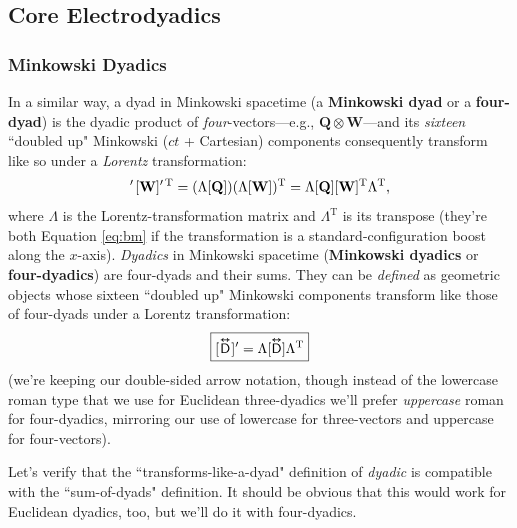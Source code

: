 \documentclass[12pt]{article}
\renewcommand{\vv}[1]{\mathbf{#1}}
\newcommand{\capdy}[1]{ \overset{ \text{\tiny$\bm\leftrightarrow$} }{\vphantom{\text{\small{A}}}\smash{#1}} }
\begin{document}
\subsection{Core Electrodyadics}\label{ssec:mfd}

\subsubsection{Minkowski Dyadics}

In a similar way, a dyad in Minkowski spacetime (a \textbf{Minkowski dyad} or a \textbf{four-dyad}) is the dyadic product of \emph{four}-vectors---e.g., $\vv Q \otimes \vv W$---and its \emph{sixteen} ``doubled up" Minkowski ($ct$ + Cartesian) components consequently transform like so under a \emph{Lorentz} transformation:
\begin{equation*}
[\vv Q ]^\prime \mkern2mu [\vv W]^{\prime \, \mathrm{T}} = ( \Lambda [\vv Q] ) ( \Lambda [\vv W] )^\mathrm{T} = \Lambda [\vv Q] [\vv W]^{\mathrm{T}} \Lambda^{\mathrm{T}} ,
\end{equation*}
where $\Lambda$ is the Lorentz-transformation matrix and $\Lambda^{\mathrm{T}}$ is its transpose (they're both Equation \ref{eq:bm} if the transformation is a standard-configuration boost along the $x$-axis). \emph{Dyadics} in Minkowski spacetime (\textbf{Minkowski dyadics} or \textbf{four-dyadics}) are four-dyads and their sums. They can be \emph{defined} as geometric objects whose sixteen ``doubled up" Minkowski components transform like those of four-dyads under a Lorentz transformation:
\begin{equation}\label{eq:ltd}
\boxed{ [ \mkern1mu {\capdy{\mathsf{D}}} \mkern1mu ]^\prime = \Lambda [ \capdy{\mathsf{D}} ] \Lambda^{\mathrm{T}}}
\end{equation}
(we're keeping our double-sided arrow notation, though instead of the lowercase roman type that we use for Euclidean three-dyadics we'll prefer \emph{uppercase} roman for four-dyadics, mirroring our use of lowercase for three-vectors and uppercase for four-vectors).

Let's verify that the ``transforms-like-a-dyad" definition of \emph{dyadic} is compatible with the ``sum-of-dyads" definition. It should be obvious that this would work for Euclidean dyadics, too, but we'll do it with four-dyadics.
\end{document}
